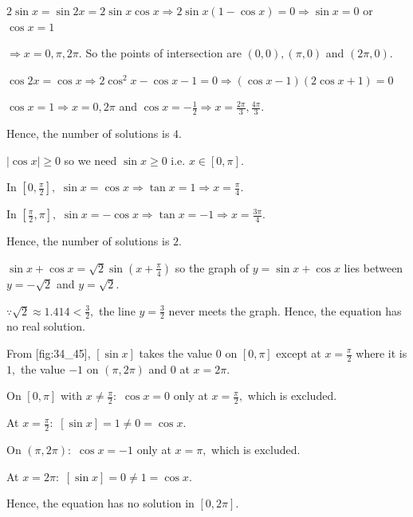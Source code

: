   \startplacefigure[title={Plot of $2\sin x$ and $\sin2x$}, reference=fig:34_64]
    \externalfigure[34_64.pdf]
  \stopplacefigure

  $2\sin x = \sin2x = 2\sin x\cos x \Rightarrow 2\sin x(1 - \cos x) = 0 \Rightarrow \sin x = 0$ or $\cos x = 1$

  $\Rightarrow x = 0, \pi, 2\pi.$ So the points of intersection are $(0, 0), (\pi, 0)$ and $(2\pi, 0).$

\item $\cos2x = \cos x\Rightarrow 2\cos^2x - \cos x - 1 = 0\Rightarrow (\cos x - 1)(2\cos x + 1) = 0$

  $\cos x = 1\Rightarrow x = 0, 2\pi$ and $\cos x = -\frac{1}{2}\Rightarrow x = \frac{2\pi}{3}, \frac{4\pi}{3}.$

  Hence, the number of solutions is $4.$

\item $|\cos x|\geq 0$ so we need $\sin x\geq 0$ i.e. $x\in[0, \pi].$

  In $\left[0, \frac{\pi}{2}\right],$ $\sin x = \cos x\Rightarrow \tan x = 1\Rightarrow x = \frac{\pi}{4}.$

  In $\left[\frac{\pi}{2}, \pi\right],$ $\sin x = -\cos x\Rightarrow\tan x = -1\Rightarrow x = \frac{3\pi}{4}.$

  Hence, the number of solutions is $2.$

\item $\sin x + \cos x = \sqrt{2}\sin\left(x + \frac{\pi}{4}\right)$ so the graph of $y = \sin x + \cos x$ lies
  between $y = -\sqrt{2}$ and $y = \sqrt{2}.$

  $\because\sqrt{2}\approx 1.414 < \frac{3}{2},$ the line $y = \frac{3}{2}$ never meets the graph. Hence, the equation
  has no real solution.

\item From [fig:34_45], $[\sin x]$ takes the value $0$ on $[0, \pi]$ except at $x = \frac{\pi}{2}$ where it is
  $1,$ the value $-1$ on $(\pi, 2\pi)$ and $0$ at $x = 2\pi.$

  On $[0, \pi]$ with $x\neq\frac{\pi}{2}:$ $\cos x = 0$ only at $x = \frac{\pi}{2},$ which is excluded.

  At $x = \frac{\pi}{2}:$ $[\sin x] = 1\neq 0 = \cos x.$

  On $(\pi, 2\pi):$ $\cos x = -1$ only at $x = \pi,$ which is excluded.

  At $x = 2\pi:$ $[\sin x] = 0\neq 1 = \cos x.$

  Hence, the equation has no solution in $[0, 2\pi].$

